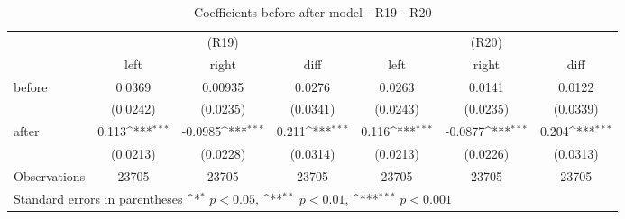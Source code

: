\begin{table}[!ht]\centering \footnotesize
\def\sym#1{\ifmmode^{#1}\else\(^{#1}\)\fi}
\caption{Coefficients before after model - R19 - R20}
\begin{tabular}{l*{6}{c}}
\hline\hline
                    &\multicolumn{3}{c}{(R19)}&\multicolumn{3}{c}{(R20)}\\
&\multicolumn{1}{c}{left}&\multicolumn{1}{c}{right}&\multicolumn{1}{c}{diff}&\multicolumn{1}{c}{left}&\multicolumn{1}{c}{right}&\multicolumn{1}{c}{diff}\\
\hline
before              &      0.0369         &     0.00935         &      0.0276         &      0.0263         &      0.0141         &      0.0122         \\
                    &    (0.0242)         &    (0.0235)         &    (0.0341)         &    (0.0243)         &    (0.0235)         &    (0.0339)         \\
[0.5em]
after               &       0.113\sym{***}&     -0.0985\sym{***}&       0.211\sym{***}&       0.116\sym{***}&     -0.0877\sym{***}&       0.204\sym{***}\\
                    &    (0.0213)         &    (0.0228)         &    (0.0314)         &    (0.0213)         &    (0.0226)         &    (0.0313)         \\
\hline
Observations        &       23705         &       23705         &       23705         &       23705         &       23705         &       23705         \\
\hline\hline
\multicolumn{7}{l}{ Standard errors in parentheses \sym{*} \(p<0.05\), \sym{**} \(p<0.01\), \sym{***} \(p<0.001\)}\\
\end{tabular}
\end{table}

